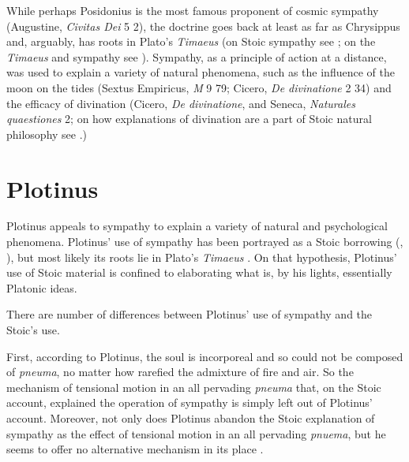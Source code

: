 While perhaps Posidonius is the most famous proponent of cosmic sympathy (Augustine, \emph{Civitas Dei} 5 2), the doctrine goes back at least as far as Chrysippus and, arguably, has roots in Plato's \emph{Timaeus} (on Stoic sympathy see \citealt{Sambursky:1959ms,Meyer:2009xp,Brouwer:2015ee}; on the \emph{Timaeus} and sympathy see \citealt{Emilsson:2015wf}). Sympathy, as a principle of action at a distance, was used to explain a variety of natural phenomena, such as the influence of the moon on the tides (Sextus Empiricus, \emph{M} 9 79; Cicero, \emph{De divinatione} 2 34) and the efficacy of divination (Cicero, \emph{De divinatione}, and Seneca, \emph{Naturales quaestiones} 2; on how explanations of divination are a part of Stoic natural philosophy see \citealt{Struck:2007aa}.)


\section{Plotinus} %
\label{sec:plotinus}

Plotinus appeals to sympathy to explain a variety of natural and psychological phenomena. Plotinus' use of sympathy has been portrayed as a Stoic borrowing (\citealt[chapter 3]{Emilsson:1988uq}, \citealt{Ierodiakonou:2006gf}), but most likely its roots lie in Plato's \emph{Timaeus} \citep{Emilsson:2015wf}. On that hypothesis, Plotinus' use of Stoic material is confined to elaborating what is, by his lights, essentially Platonic ideas.

There are number of differences between Plotinus' use of sympathy and the Stoic's use.

First, according to Plotinus, the soul is incorporeal and so could not be composed of \emph{pneuma}, no matter how rarefied the admixture of fire and air. So the mechanism of tensional motion in an all pervading \emph{pneuma} that, on the Stoic account, explained the operation of sympathy is simply left out of Plotinus' account. Moreover, not only does Plotinus abandon the Stoic explanation of sympathy as the effect of tensional motion in an all pervading \emph{pnuema}, but he seems to offer no alternative mechanism in its place \citep[48]{Emilsson:1988uq}.

